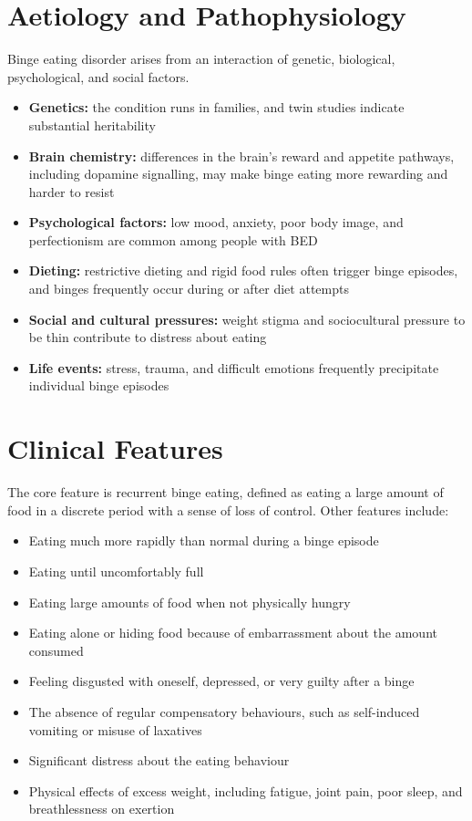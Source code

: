 \section*{Aetiology and Pathophysiology}
Binge eating disorder arises from an interaction of genetic, biological, psychological, and social factors.

\begin{itemize}
    \item \textbf{Genetics:} the condition runs in families, and twin studies indicate substantial heritability
    \item \textbf{Brain chemistry:} differences in the brain's reward and appetite pathways, including dopamine signalling, may make binge eating more rewarding and harder to resist
    \item \textbf{Psychological factors:} low mood, anxiety, poor body image, and perfectionism are common among people with BED
    \item \textbf{Dieting:} restrictive dieting and rigid food rules often trigger binge episodes, and binges frequently occur during or after diet attempts
    \item \textbf{Social and cultural pressures:} weight stigma and sociocultural pressure to be thin contribute to distress about eating
    \item \textbf{Life events:} stress, trauma, and difficult emotions frequently precipitate individual binge episodes
\end{itemize}

\section*{Clinical Features}
The core feature is recurrent binge eating, defined as eating a large amount of food in a discrete period with a sense of loss of control. Other features include:

\begin{itemize}
    \item Eating much more rapidly than normal during a binge episode
    \item Eating until uncomfortably full
    \item Eating large amounts of food when not physically hungry
    \item Eating alone or hiding food because of embarrassment about the amount consumed
    \item Feeling disgusted with oneself, depressed, or very guilty after a binge
    \item The absence of regular compensatory behaviours, such as self-induced vomiting or misuse of laxatives
    \item Significant distress about the eating behaviour
    \item Physical effects of excess weight, including fatigue, joint pain, poor sleep, and breathlessness on exertion
\end{itemize}


